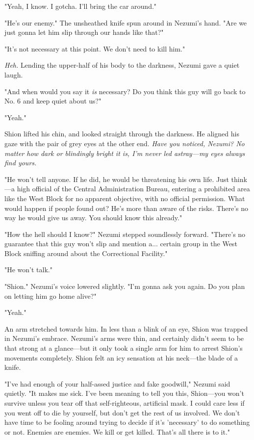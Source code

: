 "Yeah, I know. I gotcha. I'll bring the car around."

"He's our enemy." The unsheathed knife spun around in Nezumi's hand.
"Are we just gonna let him slip through our hands like that?"

"It's not necessary at this point. We don't need to kill him."

\emph{Heh.} Lending the upper-half of his body to the darkness, Nezumi gave a
quiet laugh.

"And when would you say it \emph{is} necessary? Do you think this guy will go
back to No. 6 and keep quiet about us?"

"Yeah."

Shion lifted his chin, and looked straight through the darkness. He
aligned his gaze with the pair of grey eyes at the other end. \emph{Have you
noticed, Nezumi? No matter how dark or blindingly bright it is, I'm
never led astray---my eyes always find yours.}

"He won't tell anyone. If he did, he would be threatening his own life.
Just think---a high official of the Central Administration Bureau,
entering a prohibited area like the West Block for no apparent
objective, with no official permission. What would happen if people
found out? He's more than aware of the risks. There's no way he would
give us away. You should know this already."

"How the hell should I know?" Nezumi stepped soundlessly forward.
"There's no guarantee that this guy won't slip and mention a... certain
group in the West Block sniffing around about the Correctional
Facility."

"He won't talk."

"Shion." Nezumi's voice lowered slightly. "I'm gonna ask you again. Do
you plan on letting him go home alive?"

"Yeah."

An arm stretched towards him. In less than a blink of an eye, Shion was
trapped in Nezumi's embrace. Nezumi's arms were thin, and certainly
didn't seem to be that strong at a glance---but it only took a single arm
for him to arrest Shion's movements completely. Shion felt an icy
sensation at his neck---the blade of a knife.

"I've had enough of your half-assed justice and fake goodwill," Nezumi
said quietly. "It makes me sick. I've been meaning to tell you this,
Shion---you won't survive unless you tear off that self-righteous,
artificial mask. I could care less if you went off to die by yourself,
but don't get the rest of us involved. We don't have time to be fooling
around trying to decide if it's 'necessary' to do something or not.
Enemies are enemies. We kill or get killed. That's all there is to it."


